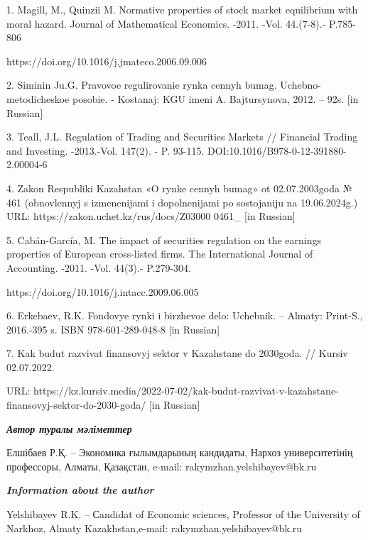 \begin{noparindent}
1. Magill, M., Quinzii M. Normative properties of stock market
equilibrium with moral hazard. Journal of Mathematical Economics. -2011.
-Vol. 44.(7-8).- P.785-806

https://doi.org/10.1016/j.jmateco.2006.09.006

2. Siminin Ju.G. Pravovoe regulirovanie rynka cennyh bumag.
Uchebno-metodicheskoe posobie. - Kostanaj: KGU imeni A. Bajtursynova,
2012. -- 92s. {[}in Russian{]}

3. Teall, J.L. Regulation of Trading and Securities Markets // Financial
Trading and Investing. -2013.-Vol. 147(2). - P. 93-115.
DOI:10.1016/B978-0-12-391880-2.00004-6

4. Zakon Respubliki Kazahstan «O rynke cennyh bumag» ot 02.07.2003goda №
461 (obnovlennyj s izmenenijami i dopolnenijami po sostojaniju na
19.06.2024g.) URL: https://zakon.uchet.kz/rus/docs/Z03000 0461\_ {[}in
Russian{]}

5. Cabán-García, M. The impact of securities regulation on the earnings
properties of European cross-listed firms. The International Journal of
Accounting. -2011. -Vol. 44(3).- P.279-304.

https://doi.org/10.1016/j.intacc.2009.06.005

6. Erkebaev, R.K. Fondovye rynki i birzhevoe delo: Uchebnik. -- Almaty:
Print-S., 2016.-395 s. ISBN 978-601-289-048-8 {[}in Russian{]}

7. Kak budut razvivat\textquotesingle{} finansovyj sektor v Kazahstane
do 2030goda. // Kursiv 02.07.2022.

URL:
https://kz.kursiv.media/2022-07-02/kak-budut-razvivat-v-kazahstane-finansovyj-sektor-do-2030-goda/
{[}in Russian{]}
\end{noparindent}

\emph{{\bfseries Автор туралы мәліметтер}}

\begin{noparindent}
Елшібаев Р.Қ. -- Экономика ғылымдарының кандидаты, Нархоз
университетінің профессоры, Алматы, Қазақстан, e-mail:
rakymzhan.yelshibayev@bk.ru
\end{noparindent}

\emph{{\bfseries Information about the author}}

\begin{noparindent}
Yelshibayev R.K. -- Сandidat of Economic sciences, Professor of the
University of Narkhoz, Almaty Kazakhstan,e-mail:
rakymzhan.yelshibayev@bk.ru
\end{noparindent}


